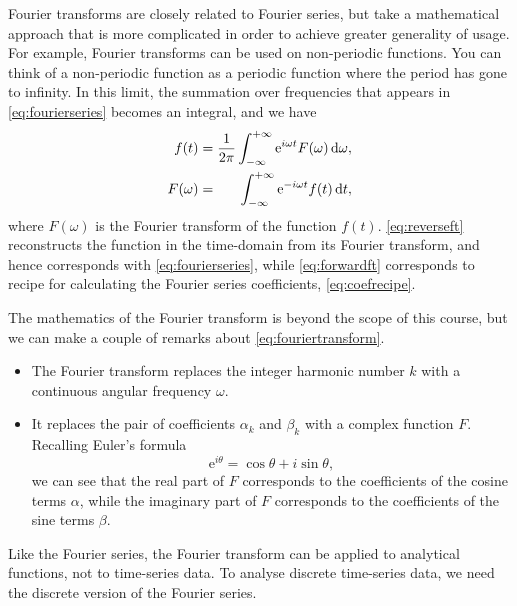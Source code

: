 \documentclass[11pt,twoside,a4paper]{article}
\begin{document}
Fourier transforms are closely related to Fourier series, but take a
mathematical approach that is more complicated in order to achieve
greater generality of usage. For example, Fourier transforms can be
used on non-periodic functions.  You can think of a non-periodic
function as a periodic function where the period has gone to
infinity.  In this limit, the summation over frequencies that appears
in \autoref{eq:fourierseries} becomes an integral, and we have
\begin{subequations}
  \label{eq:fouriertransform}
  \begin{align}
    \label{eq:reverseft}
    {f}(t) &=
    \frac{1}{2\pi}\int_{-\infty}^{+\infty}\text{e}^{i\omega
      t}{F}(\omega)\,\textrm{d} \omega,\\
    \label{eq:forwardft}
    {F}(\omega) &= \;\;\;\;\;\;\int_{-\infty}^{+\infty}\text{e}^{-i\omega
      t}{f}(t)\,\textrm{d} t, 
  \end{align}
\end{subequations}
where $F(\omega)$ is the Fourier transform of the function
$f(t)$. \autoref{eq:reverseft} reconstructs the function in the
time-domain from its Fourier transform, and hence corresponds with
\autoref{eq:fourierseries}, while \autoref{eq:forwardft} corresponds
to recipe for calculating the Fourier series coefficients,
\autoref{eq:coefrecipe}.

The mathematics of the Fourier transform is beyond the scope of this
course, but we can make a couple of remarks about
\autoref{eq:fouriertransform}.
\begin{itemize}
\item The Fourier transform replaces the integer harmonic number $k$
  with a continuous angular frequency $\omega$.
\item It replaces the pair of coefficients $\alpha_k$ and $\beta_k$
  with a complex function $F$. Recalling Euler's formula
  \begin{displaymath}
    \text{e}^{i\theta} = \cos\theta + i\sin\theta,
  \end{displaymath}
  we can see that the real part of $F$ corresponds to the coefficients
  of the cosine terms $\alpha$, while the imaginary part of $F$
  corresponds to the coefficients of the sine terms $\beta$.
\end{itemize}
Like the Fourier series, the Fourier transform can be applied to
analytical functions, not to time-series data.  To analyse discrete
time-series data, we need the discrete version of the Fourier series.
\end{document}

